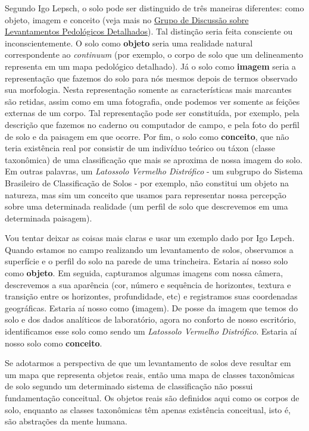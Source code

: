 Segundo Igo Lepsch, o solo pode ser distinguido de três maneiras diferentes: como objeto, imagem e conceito (veja mais no \href{https://groups.google.com/forum/#!forum/soil-mapping}{Grupo de Discussão sobre Levantamentos Pedológicos Detalhados}). Tal distinção seria feita consciente ou inconscientemente. O solo como \textbf{objeto} seria uma realidade natural correspondente ao \textit{continuum} (por exemplo, o corpo de solo que um delineamento representa em um mapa pedológico detalhado). Já o solo como \textbf{imagem} seria a representação que fazemos do solo para nós mesmos depois de termos observado sua morfologia. Nesta representação somente as características mais marcantes são retidas, assim como em uma fotografia, onde podemos ver somente as feições externas de um corpo. Tal representação pode ser constituída, por exemplo, pela descrição que fazemos no caderno ou computador de campo, e pela foto do perfil de solo e da paisagem em que ocorre. Por fim, o solo como \textbf{conceito}, que não teria existência real por consistir de um indivíduo teórico ou táxon (classe taxonômica) de uma classificação que mais se aproxima de nossa imagem do solo. Em outras palavras, um \textit{Latossolo Vermelho Distrófico} - um subgrupo do Sistema Brasileiro de Classificação de Solos - por exemplo, não constitui um objeto na natureza, mas sim um conceito que usamos para representar nossa percepção sobre uma determinada realidade (um perfil de solo que descrevemos em uma determinada paisagem).




Vou tentar deixar as coisas mais claras e usar um exemplo dado por Igo Lepch. Quando estamos no campo realizando um levantamento de solos, observamos a superfície e o perfil do solo na parede de uma trincheira. Estaria aí nosso solo como \textbf{objeto}. Em seguida, capturamos algumas imagens com nossa câmera, descrevemos a sua aparência (cor, número e sequência de horizontes, textura e transição entre os horizontes, profundidade, etc) e registramos suas coordenadas geográficas. Estaria aí nosso como \textbf(imagem). De posse da imagem que temos do solo e dos dados analíticos de laboratório, agora no conforto de nosso escritório, identificamos esse solo como sendo um \textit{Latossolo Vermelho Distrófico}. Estaria aí nosso solo como \textbf{conceito}.




Se adotarmos a perspectiva de que um levantamento de solos deve resultar em um mapa que representa objetos reais, então uma mapa de classes taxonômicas de solo segundo um determinado sistema de classificação não possui fundamentação conceitual. Os objetos reais são definidos aqui como os corpos de solo, enquanto as classes taxonômicas têm apenas existência conceitual, isto é, são abstrações da mente humana.





